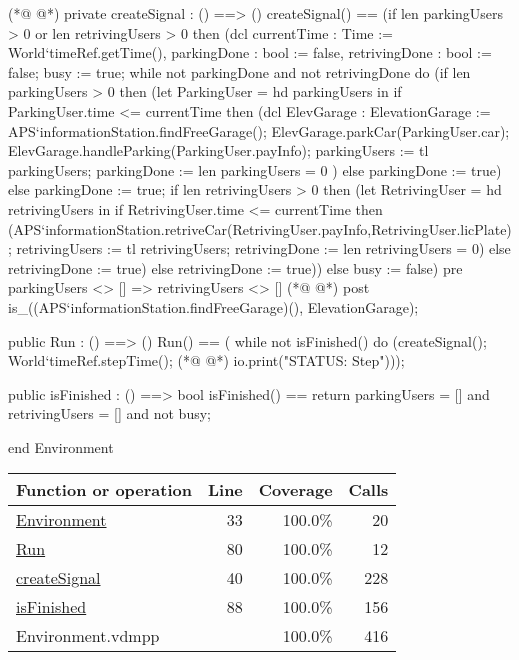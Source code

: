 \begin{vdmpp}[breaklines=true]
(*@
\label{createSignal:40}
@*)
private createSignal : () ==> ()
createSignal() ==
 (if len parkingUsers > 0 or len retrivingUsers > 0 
  then 
    (dcl 
      currentTime   : Time := World`timeRef.getTime(),
      parkingDone   : bool := false,
      retrivingDone : bool := false;
    busy := true;
    while not parkingDone and not retrivingDone
        do
          (if len parkingUsers > 0
           then
             (let
                 ParkingUser = hd parkingUsers
              in
                 if ParkingUser.time <= currentTime
                 then
                   (dcl ElevGarage : ElevationGarage := APS`informationStation.findFreeGarage();
                    ElevGarage.parkCar(ParkingUser.car);
                    ElevGarage.handleParking(ParkingUser.payInfo);
                    parkingUsers := tl parkingUsers;
                    parkingDone := len parkingUsers = 0
                    )
                 else parkingDone := true)
           else parkingDone := true;
           if len retrivingUsers > 0
           then
             (let
               RetrivingUser = hd retrivingUsers
              in
                if RetrivingUser.time <= currentTime
                then 
                  (APS`informationStation.retriveCar(RetrivingUser.payInfo,RetrivingUser.licPlate);
                   retrivingUsers := tl retrivingUsers;
                   retrivingDone := len retrivingUsers = 0)
                else retrivingDone := true)
           else retrivingDone := true))
  else busy := false) 
pre parkingUsers <> [] => retrivingUsers <> [] 
(*@
\label{Run:80}
@*)
post is_((APS`informationStation.findFreeGarage)(), ElevationGarage);                   
                          
public Run : () ==> ()
Run() == (
  while not isFinished()
  do
   (createSignal();
    World`timeRef.stepTime();
(*@
\label{isFinished:88}
@*)
    io.print("STATUS: Step\n")));
 
public isFinished : () ==> bool
isFinished() ==
 return parkingUsers = [] and retrivingUsers = [] and not busy;
 
end Environment
\end{vdmpp}
\bigskip
\begin{longtable}{|l|r|r|r|}
\hline
Function or operation & Line & Coverage & Calls \\
\hline
\hline
\hyperref[Environment:33]{Environment} & 33&100.0\% & 20 \\
\hline
\hyperref[Run:80]{Run} & 80&100.0\% & 12 \\
\hline
\hyperref[createSignal:40]{createSignal} & 40&100.0\% & 228 \\
\hline
\hyperref[isFinished:88]{isFinished} & 88&100.0\% & 156 \\
\hline
\hline
Environment.vdmpp & & 100.0\% & 416 \\
\hline
\end{longtable}

